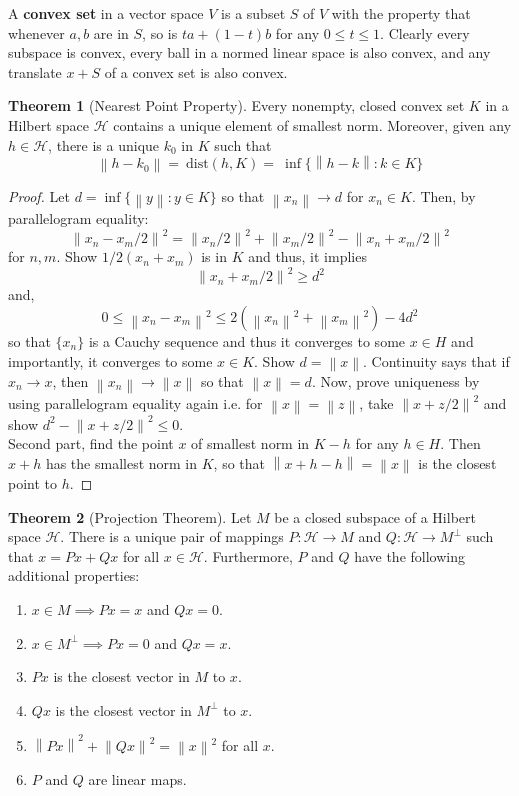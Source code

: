 \documentclass{article}
\theoremstyle{definition}
\newtheorem{theorem}{Theorem}
\newcommand{\norm}[1]{\left\lVert#1\right\rVert}
\begin{document}
    A \textbf{convex set} in a vector space $V$ is a subset $S$ of $V$ with the property that whenever $a,b$ are in $S$, so is
    $ta+(1-t)b$ for any $0\leq t\leq 1$. Clearly every subspace is convex, every ball in a normed linear space is also convex,
    and any translate $x+S$ of a convex set is also convex. 
    
    \begin{theorem}[Nearest Point Property]
        Every nonempty, closed convex set $K$ in a Hilbert space $\mathcal{H}$ contains a unique element of smallest norm. Moreover,
        given any $h\in\mathcal{H}$, there is a unique $k_0$ in $K$ such that
        \[ \norm{h-k_0} =\:\text{dist}(h,K) =\:\inf\{\norm{h-k}:k\in K\} \]
    \end{theorem}

    \begin{proof}
        Let $d =\inf\{\norm{y}:y\in K\}$ so that $\norm{x_n}\to d$ for $x_n\in K$. Then, by parallelogram equality:
        \[ \norm{x_n-x_m/2}^2 = \norm{x_n/2}^2 + \norm{x_m/2}^2 - \norm{x_n+x_m/2}^2 \]
        for $n,m$. Show $1/2(x_n + x_m)$ is in $K$ and thus, it implies
        \[ \norm{x_n+x_m/2}^2 \geq d^2 \]
        and,
        \[ 0 \leq \norm{x_n-x_m}^2 \leq 2(\norm{x_n}^2 + \norm{x_m}^2) - 4d^2 \]
        so that $\{x_n\}$ is a Cauchy sequence and thus it converges to some $x\in H$ and importantly, it converges to some
        $x\in K$. Show $d = \norm{x}$. Continuity says that if $x_n\to x$, then $\norm{x_n} \to \norm{x}$ so that $\norm{x} =d$.
        Now, prove uniqueness by using parallelogram equality again i.e. for $\norm{x}=\norm{z}$, take $\norm{x+z/2}^2$ and show
        $d^2 - \norm{x+z/2}^2 \leq 0$.\\

        Second part, find the point $x$ of smallest norm in $K-h$ for any $h\in H$. Then $x+h$ has the smallest norm in $K$, so that
        $\norm{x+h-h} = \norm{x}$ is the closest point to $h$.
    \end{proof}

    \begin{theorem}[Projection Theorem]
            Let $M$ be a closed subspace of a Hilbert space $\mathcal{H}$. There is a unique pair of mappings $P:\mathcal{H}\to M$
            and $Q:\mathcal{H}\to M^{\perp}$ such that $x = Px + Qx$ for all $x\in\mathcal{H}$. Furthermore, $P$ and $Q$ have the
            following additional properties:
            \begin{enumerate}
                \item $x\in M\implies Px = x$ and $Qx = 0$.
                \item $x\in M^{\perp}\implies Px = 0$ and $Qx = x$.
                \item $Px$ is the closest vector in $M$ to $x$.
                \item $Qx$ is the closest vector in $M^{\perp}$ to $x$.
                \item $\norm{Px}^2 + \norm{Qx}^2 = \norm{x}^2$ for all $x$.
                \item $P$ and $Q$ are linear maps.
            \end{enumerate}
    \end{theorem}
\end{document}
